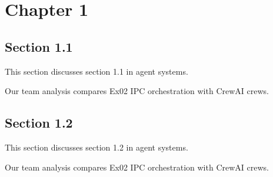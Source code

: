 \section{Chapter 1}

\subsection{Section 1.1}
This section discusses section 1.1 in agent systems. \cite{crewai2024}

Our team analysis compares Ex02 IPC orchestration with CrewAI crews. \cite{crewai2024}

\subsection{Section 1.2}
This section discusses section 1.2 in agent systems. \cite{crewai2024}

Our team analysis compares Ex02 IPC orchestration with CrewAI crews. \cite{crewai2024}
